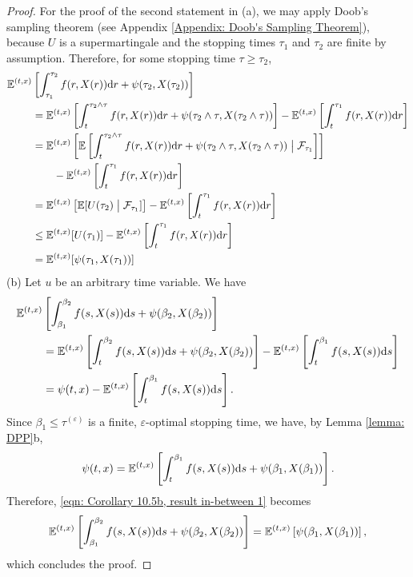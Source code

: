 \begin{proof}
    For the proof of the second statement in (a), we may apply Doob's sampling theorem (see Appendix \ref{Appendix: Doob's Sampling Theorem}), because $U$ is a supermartingale and the stopping times $\tau_1$ and $\tau_2$ are finite by assumption. Therefore, for some stopping time $\tau \geq \tau_2$,
    \begin{align*}
        \mathbb{E}^{(t,x)} &\left[ \int_{\tau_1}^{\tau_2} f(r,X(r)) \mathrm{d} r + \psi(\tau_2, X(\tau_2)) \right] \\
        &= \mathbb{E}^{(t,x)} \left[ \int_{t}^{\tau_2 \wedge \tau} f(r,X(r)) \mathrm{d} r + \psi(\tau_2 \wedge \tau, X(\tau_2 \wedge \tau)) \right] - \mathbb{E}^{(t,x)} \left[\int_{t}^{\tau_1} f(r,X(r)) \mathrm{d} r \right] \\
        &= \mathbb{E}^{(t,x)} \left[ \mathbb{E} \left[\int_{t}^{\tau_2 \wedge \tau} f(r,X(r)) \mathrm{d} r + \psi(\tau_2 \wedge \tau, X(\tau_2 \wedge \tau)) \bigm| \mathcal{F}_{\tau_1} \right] \right] \\
        & \qquad - \mathbb{E}^{(t,x)} \left[\int_{t}^{\tau_1} f(r,X(r)) \mathrm{d} r \right] \\
        &= \mathbb{E}^{(t,x)} \left[ \mathbb{E}[ U(\tau_2) \bigm| \mathcal{F}_{\tau_1}] \right] - \mathbb{E}^{(t,x)} \left[\int_{t}^{\tau_1} f(r,X(r)) \mathrm{d} r \right] \\
        & \leq \mathbb{E}^{(t,x)} [U(\tau_1)] - \mathbb{E}^{(t,x)} \left[\int_{t}^{\tau_1} f(r,X(r)) \mathrm{d} r \right] \\
        &= \mathbb{E}^{(t,x)} [\psi(\tau_1, X(\tau_1))]
    \end{align*}
    (b) Let $u$ be an arbitrary time variable. We have 
    \begin{align}
        \mathbb{E}^{(t,x)} &\left[ \int_{\beta_1}^{\beta_2} f(s,X(s)) \mathrm{d} s + \psi(\beta_2, X(\beta_2)) \right] \nonumber \\
        &= \mathbb{E}^{(t,x)} \left[ \int_{t}^{\beta_2} f(s,X(s)) \mathrm{d} s + \psi(\beta_2, X(\beta_2)) \right] - \mathbb{E}^{(t,x)} \left[ \int_{t}^{\beta_1} f(s,X(s)) \mathrm{d} s \right] \nonumber \\
        &= \psi(t,x) - \mathbb{E}^{(t,x)} \left[ \int_{t}^{\beta_1} f(s,X(s)) \mathrm{d} s \right].
        \label{eqn: Corollary 10.5b, result in-between 1}
    \end{align}
    Since $\beta_1 \leq \tau^{(\varepsilon)}$ is a finite, $\varepsilon$-optimal stopping time, we have, by Lemma \ref{lemma: DPP}b, 
    \begin{equation*}
        \psi(t,x) = \mathbb{E}^{(t,x)} \left[ \int_t^{\beta_1} f(s,X(s)) \mathrm{d} s  + \psi(\beta_1, X(\beta_1))\right].
    \end{equation*}
    Therefore, \eqref{eqn: Corollary 10.5b, result in-between 1} becomes
    \begin{align*}
        \mathbb{E}^{(t,x)} \left[ \int_{\beta_1}^{\beta_2} f(s,X(s)) \mathrm{d} s + \psi(\beta_2, X(\beta_2)) \right] = \mathbb{E}^{(t,x)} \left[\psi(\beta_1, X(\beta_1))\right],
    \end{align*}
    which concludes the proof.
\end{proof}

